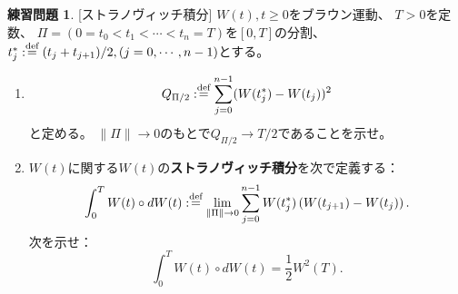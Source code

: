 \documentclass[uplatex]{jsarticle}
\theoremstyle{definition}
\newtheorem{prob}[prob]{練習問題}
\def\dfn{:\overset{\mbox{{\scriptsize def}}}{=}}
\begin{document}
\begin{prob}\label{prob: 4.4}
  [ストラノヴィッチ積分]
  \(W(t), t\geq 0\)をブラウン運動、
  \(T > 0\)を定数、
  \(\Pi = (0 = t_0 < t_1 < \cdots < t_n = T)\)を\([0,T]\)の分割、
  \(t_j^* \dfn (t_j+t_{j+1})/2 , (j=0,\cdots, n-1)\)とする。
  \begin{enumerate}
    \item \label{enumi: 4.4-1}
    \[
    Q_{\Pi/2} \dfn \sum_{j=0}^{n-1}(W(t_j^*) - W(t_j))^2
    \]
    と定める。
    \(\|\Pi\| \to 0\)のもとで\(Q_{\Pi/2}\to T/2\)であることを示せ。
    \item \label{enumi: 4.4-2}
    \(W(t)\)に関する\(W(t)\)の\textbf{ストラノヴィッチ積分}を次で定義する：
    \[
    \int_0^TW(t)\circ dW(t)
    \dfn \lim_{\|\Pi\| \to 0}\sum_{j=0}^{n-1}W(t_j^*)
    \left( W(t_{j+1}) - W(t_j)\right).
    \]
    次を示せ：
    \[\int_0^TW(t)\circ dW(t) = \frac{1}{2}W^2(T).\]
  \end{enumerate}
\end{prob}
\end{document}
